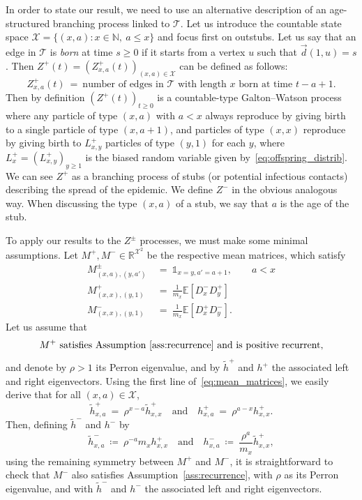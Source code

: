 \begin{refsegment}
In order to state our result, we need to use an alternative
description of an age-structured branching process linked to
$\mathcal{T}$. Let us introduce the countable state space
$\mathcal{X}= \{(x,a) : x\in \mathbb{N},\ a\leq x\}$ and focus first
on outstubs. Let us say that an edge in $\mathcal{T}$ is \emph{born}
at time $s\geq 0$ if it starts from a vertex $u$ such that
$\vec{d}(1,u)=s$. Then
$Z^+(t)=(Z^+_{x,a}(t))_{(x,a)\in \mathcal{X}}$ can be defined as
follows:
\[
  Z^+_{x,a}(t)\ =\ \text{number of edges in $\mathcal{T}$ with length $x$ born at time
  }t-a+1.
\]
Then by definition $(Z^+(t))_{t\geq 0}$ is a countable-type
Galton--Watson process where any particle of type $(x,a)$ with $a<x$
always reproduce by giving birth to a single particle of type
$(x,a+1)$, and particles of type $(x,x)$ reproduce by giving birth to
$L_{x,y}^+$ particles of type $(y,1)$ for each $y$, where
$L_x^+=(L_{x,y}^+)_{y\geq 1}$ is the biased random variable given
by~\eqref{eq:offspring_distrib}. We can see $Z^+$ as a branching
process of stubs (or potential infectious contacts) describing the
spread of the epidemic. We define $Z^-$ in the obvious analogous way.
When discussing the type $(x,a)$ of a stub, we say that $a$ is the age
of the stub.

To apply our results to the $Z^{\pm}$ processes, we must make some
minimal assumptions. Let $M^+,M^-\in \mathbb{R}^{\mathcal{X}^2}$ be
the respective mean matrices, which satisfy
\begin{equation}
  \label{eq:mean_matrices}
  \begin{aligned}
    M^\pm_{(x,a),(y,a')}\ &=\ \mathds{1}_{x=y, a'=a+1}, \qquad a < x \\
    M^+_{(x,x),(y,1)}\ &=\ \frac{1}{m_x}\mathbb{E}[D^-_x D^+_y] \\
    M^-_{(x,x),(y,1)}\ &=\ \frac{1}{m_x}\mathbb{E}[D^+_x D^-_y].
  \end{aligned}
\end{equation}
Let us assume that
\begin{equation}
  \label{eq:Mplus_satisfies_I}
  M^+\text{ satisfies Assumption~\ref{ass:recurrence} and is positive recurrent},
\end{equation}
and denote by $\rho>1$ its Perron eigenvalue, and by $\tilde{h}^+$ and
$h^+$ the associated left and right eigenvectors. Using the first line
of~\eqref{eq:mean_matrices}, we easily derive that for all
$(x,a)\in \mathcal{X}$,
\begin{equation} \label{eq:relations-hxa-hxx}
  \tilde{h}^+_{x,a}\ =\ \rho^{x-a}\tilde h^+_{x,x} \quad \text{and} \quad
  h^{+}_{x,a}\ =\ \rho^{a-x}h^+_{x,x}.
\end{equation}
Then, defining $\tilde{h}^-$ and $h^-$ by
\begin{equation}
  \label{eq:relations-h+h-}
  \tilde{h}^-_{x,a}\ \coloneqq\ \rho^{-a}m_x h^+_{x,x} \quad \text{and} \quad
  h^-_{x,a}\ \coloneqq\ \frac{\rho^a}{m_x} \tilde{h}^+_{x,x},
\end{equation}
using the remaining symmetry between $M^+$ and $M^-$, it is
straightforward to check that $M^-$ also satisfies
Assumption~\ref{ass:recurrence}, with $\rho$ as its Perron eigenvalue,
and with $\tilde{h}^-$ and $h^-$ the associated left and right
eigenvectors.



\end{refsegment}
